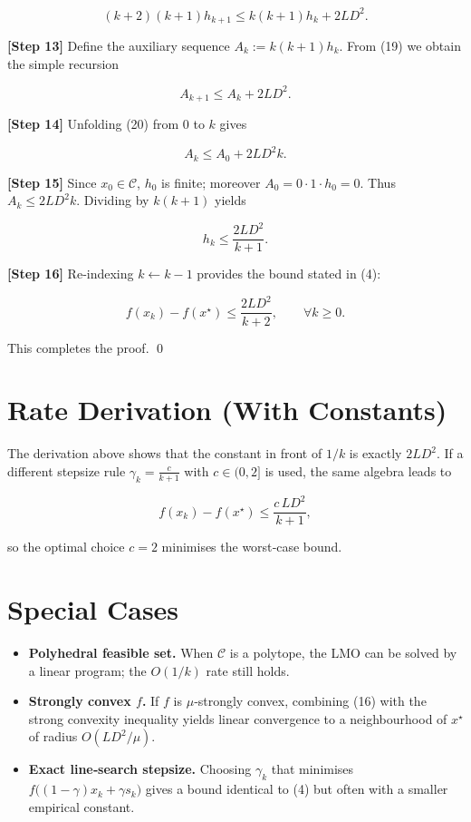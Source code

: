 \documentclass{article}
\begin{document}
\[
(k+2)(k+1)h_{k+1}\le k(k+1)h_k+2L D^{2}.
\tag{19}
\]

\noindent\textbf{[Step 13]} Define the auxiliary sequence $A_k:=k(k+1)h_k$.  
From (19) we obtain the simple recursion  

\[
A_{k+1}\le A_k+2L D^{2}.
\tag{20}
\]

\noindent\textbf{[Step 14]} Unfolding (20) from $0$ to $k$ gives  

\[
A_{k}\le A_{0}+2L D^{2}k .
\tag{21}
\]

\noindent\textbf{[Step 15]} Since $x_0\in\mathcal C$, $h_0$ is finite; moreover $A_0=0\cdot1\cdot h_0=0$.  
Thus $A_k\le 2L D^{2}k$.  Dividing by $k(k+1)$ yields

\[
h_k\le \frac{2L D^{2}}{k+1}.
\tag{22}
\]

\noindent\textbf{[Step 16]} Re‑indexing $k\leftarrow k-1$ provides the bound stated in (4):

\[
f(x_k)-f(x^\star)\le \frac{2L D^{2}}{k+2},\qquad\forall k\ge0 .
\]

This completes the proof. \qed

\section*{Rate Derivation (With Constants)}
The derivation above shows that the constant in front of $1/k$ is exactly $2L D^{2}$.  
If a different stepsize rule $\gamma_k=\frac{c}{k+1}$ with $c\in(0,2]$ is used, the same algebra leads to  

\[
f(x_k)-f(x^\star)\le \frac{c\,L D^{2}}{k+1},
\]

so the optimal choice $c=2$ minimises the worst‑case bound.

\section*{Special Cases}
\begin{itemize}
\item \textbf{Polyhedral feasible set.} When $\mathcal C$ is a polytope, the LMO can be solved by a linear program; the $O(1/k)$ rate still holds.
\item \textbf{Strongly convex $f$.} If $f$ is $\mu$‑strongly convex, combining (16) with the strong convexity inequality yields linear convergence to a neighbourhood of $x^\star$ of radius $O(L D^{2}/\mu)$.
\item \textbf{Exact line‑search stepsize.} Choosing $\gamma_k$ that minimises $f\big((1-\gamma)x_k+\gamma s_k\big)$ gives a bound identical to (4) but often with a smaller empirical constant.
\end{itemize}
\end{document}
